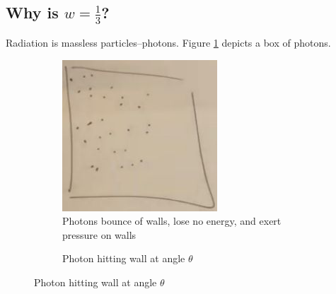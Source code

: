 \documentclass[]{article}
\begin{document}
\subsection{Why is $w=\frac{1}{3}$?}\label{sec:w:1:3}

Radiation is massless particles--photons. Figure \ref{fig:cosmo-5-box-photons} depicts a box of photons.

\begin{figure}[H]
	\caption{A box of photons}
	\begin{subfigure}[t]{0.55\textwidth}
		\caption{Photons bounce of walls, lose no energy, and exert pressure on walls}\label{fig:cosmo-5-box-photons}
		\includegraphics[width=\textwidth]{cosmo-5-box-photons}
	\end{subfigure}
	\begin{subfigure}[t]{0.4\textwidth}
		\caption{Photon hitting wall at angle $\theta$}\label{fig:cosmo-5-wall}

\end{subfigure}
\end{figure}
\end{document}
